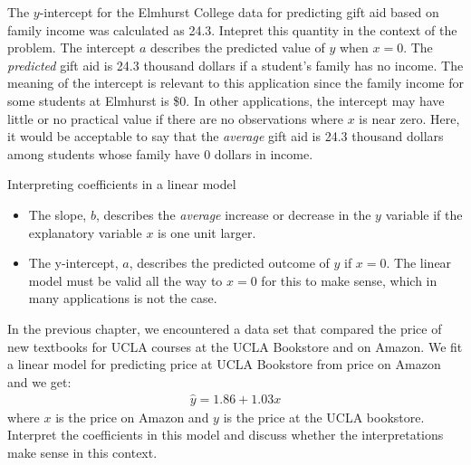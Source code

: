 \begin{examplewrap}
\begin{nexample}{The $y$-intercept for the Elmhurst College data for predicting gift aid based on family income was calculated as 24.3.  Intepret this quantity in the context of the problem. }
The intercept $a$ describes the predicted value of $y$ when $x=0$.  The \emph{predicted} gift aid is 24.3 thousand dollars if a student's family has no income.  The meaning of the intercept is relevant to this application since the family income for some students at Elmhurst is \$0. In other applications, the intercept may have little or no practical value if there are no observations where $x$ is near zero.  Here, it would be acceptable to say that the \emph{average} gift aid is 24.3 thousand dollars among students whose family have 0 dollars in income.
\end{nexample}
\end{examplewrap}

\begin{onebox}{Interpreting coefficients in a linear model}
\vspace{-4mm}
\begin{itemize}
\setlength{\itemsep}{0mm}
\item The slope, $b$, describes the \emph{average} increase or decrease in the $y$ variable if the explanatory variable $x$ is one unit larger. 
\item The y-intercept, $a$, describes the predicted outcome of $y$ if $x=0$.  The linear model must be valid all the way to $x=0$ for this to make sense, which in many applications is not the case.
\end{itemize}
\end{onebox}


\begin{exercisewrap}
\begin{nexercise}
In the previous chapter, we encountered a data set that compared the price of new textbooks for UCLA courses at the UCLA Bookstore and on Amazon.  We fit a linear model for predicting price at UCLA Bookstore from price on Amazon and we get:  
\begin{align*}
\hat{y} = 1.86 + 1.03x
\end{align*}
where $x$ is the price on Amazon and $y$ is the price at the UCLA bookstore.  Interpret the coefficients in this model and discuss whether the interpretations make sense in this context.\footnotemark
\end{nexercise}
\end{exercisewrap}


